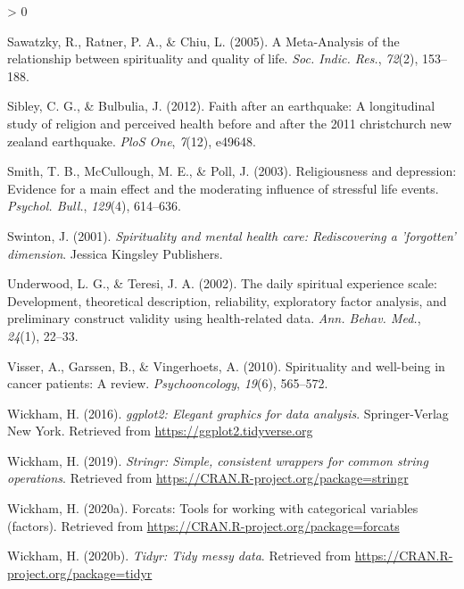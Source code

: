 \documentclass[
  english,
  man,floatsintext]{apa6}
\newlength{\cslhangindent}
\newenvironment{CSLReferences}[2] %
 {%
  \setlength{\parindent}{0pt}
  \ifodd #1 \everypar{\setlength{\hangindent}{\cslhangindent}}\ignorespaces\fi
  \ifnum #2 > 0
  \setlength{\parskip}{#2\baselineskip}
  \fi
 }%
 {}
\begin{document}
\begin{CSLReferences}{1}{0}
\leavevmode\hypertarget{ref-Sawatzky2005-rw}{}%
Sawatzky, R., Ratner, P. A., \& Chiu, L. (2005). A {Meta-Analysis} of the relationship between spirituality and quality of life. \emph{Soc. Indic. Res.}, \emph{72}(2), 153--188.

\leavevmode\hypertarget{ref-sibley2012faith}{}%
Sibley, C. G., \& Bulbulia, J. (2012). Faith after an earthquake: A longitudinal study of religion and perceived health before and after the 2011 christchurch new zealand earthquake. \emph{PloS One}, \emph{7}(12), e49648.

\leavevmode\hypertarget{ref-Smith2003-re}{}%
Smith, T. B., McCullough, M. E., \& Poll, J. (2003). Religiousness and depression: Evidence for a main effect and the moderating influence of stressful life events. \emph{Psychol. Bull.}, \emph{129}(4), 614--636.

\leavevmode\hypertarget{ref-Swinton2001-vr}{}%
Swinton, J. (2001). \emph{Spirituality and mental health care: Rediscovering a 'forgotten' dimension}. Jessica Kingsley Publishers.

\leavevmode\hypertarget{ref-Underwood2002-hg}{}%
Underwood, L. G., \& Teresi, J. A. (2002). The daily spiritual experience scale: Development, theoretical description, reliability, exploratory factor analysis, and preliminary construct validity using health-related data. \emph{Ann. Behav. Med.}, \emph{24}(1), 22--33.

\leavevmode\hypertarget{ref-Visser2010-kq}{}%
Visser, A., Garssen, B., \& Vingerhoets, A. (2010). Spirituality and well-being in cancer patients: A review. \emph{Psychooncology}, \emph{19}(6), 565--572.

\leavevmode\hypertarget{ref-R-ggplot2}{}%
Wickham, H. (2016). \emph{ggplot2: Elegant graphics for data analysis}. Springer-Verlag New York. Retrieved from \url{https://ggplot2.tidyverse.org}

\leavevmode\hypertarget{ref-R-stringr}{}%
Wickham, H. (2019). \emph{Stringr: Simple, consistent wrappers for common string operations}. Retrieved from \url{https://CRAN.R-project.org/package=stringr}

\leavevmode\hypertarget{ref-R-forcats}{}%
Wickham, H. (2020a). Forcats: Tools for working with categorical variables (factors). Retrieved from \url{https://CRAN.R-project.org/package=forcats}

\leavevmode\hypertarget{ref-R-tidyr}{}%
Wickham, H. (2020b). \emph{Tidyr: Tidy messy data}. Retrieved from \url{https://CRAN.R-project.org/package=tidyr}


\end{CSLReferences}
\end{document}
